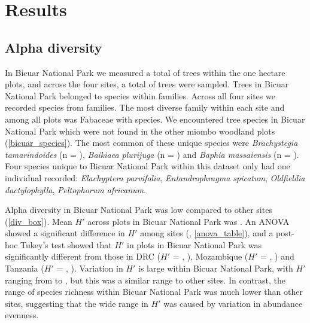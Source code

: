 \documentclass[diversity,article,submit,moreauthors,pdftex]{Definitions/mdpi}
\begin{document}
\section{Results}

\subsection{Alpha diversity}

In Bicuar National Park we measured a total of \nbicuartrees{} trees within the one hectare plots, and across the four sites,  a total of \ntrees{} trees were sampled. Trees in Bicuar National Park belonged to \nbicuarspecies{} species within \nbicuarfamilies{} families. Across all four sites we recorded \nspecies{} species from \nfamilies{} families. The most diverse family within each site and among all plots was Fabaceae with \nfabaceaespecies{} species. We encountered \nbicuaruniquespecies{} tree species in Bicuar National Park which were not found in the other miombo woodland plots (\autoref{bicuar_species}). The most common of these unique species were \textit{Brachystegia tamarindoides} (n = \nbg{}), \textit{Baikiaea plurijuga} (n = \nbp{}) and \textit{Baphia massaiensis} (n = \nbm{}). Four species unique to Bicuar National Park within this dataset only had one individual recorded: \textit{Elachyptera parvifolia}, \textit{Entandrophragma spicatum}, \textit{Oldfieldia dactylophylla}, \textit{Peltophorum africanum}.



Alpha diversity in Bicuar National Park was low compared to other sites (\autoref{div_box}). Mean $H'$ across plots in Bicuar National Park was \bicuarshannon{}. An ANOVA showed a significant difference in $H'$ among sites (\lmshannon{}, \autoref{anova_table}), and a post-hoc Tukey's test showed that $H'$ in plots in Bicuar National Park was significantly different from those in DRC ($H'$ = \drcshannon{}, \tukeyshannonbicuardrc{}), Mozambique ($H'$ = \nhamshannon{}, \tukeyshannonbicuarnham{}) and Tanzania ($H'$ = \kilwashannon{}, \tukeyshannonbicuarkilwa{}). Variation in $H'$ is large within Bicuar National Park, with $H'$ ranging from \bicuarminshannon{} to \bicuarmaxshannon{}, but this was a similar range to other sites. In contrast, the range of species richness within Bicuar National Park was much lower than other sites, suggesting that the wide range in $H'$ was caused by variation in abundance evenness.
\end{document}
